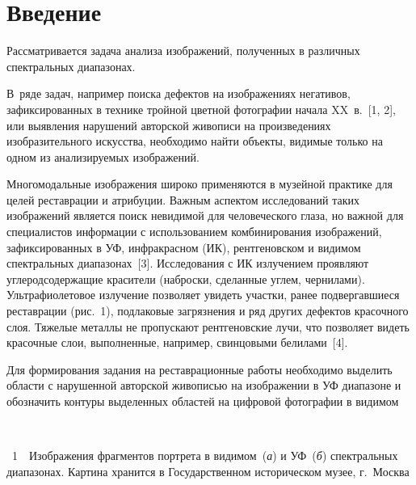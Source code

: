       \begin{multicols}{2}
      
            \label{st\stat}

\section{Введение}

  Рассматривается задача анализа изображений, полученных в различных спектральных 
диапазонах. 

В~ряде задач, например поиска дефектов на изображениях негативов, 
зафиксированных в технике тройной цветной фотографии начала XX~в.~[1, 2], или 
выявления нарушений авторской живописи на произведениях изобразительного искусства, 
необходимо найти объекты, видимые только на одном из анализируемых изображений. 

Многомодальные изображения широко применяются в музейной практике для целей 
реставрации и атрибуции. Важным аспектом исследований таких изображений является 
поиск невидимой для человеческого глаза, но важной для специалистов информации с 
использованием комбинирования изображений, зафиксированных в УФ, 
инфракрасном (ИК), рентгеновском и видимом спектральных диапазонах~[3]. Исследования с 
ИК излучением проявляют углеродсодержащие красители (наброски, сделанные 
углем, чернилами). Ультрафиолетовое излучение позволяет увидеть участки, ранее 
подвергавшиеся реставрации (рис.~1), подлаковые загрязнения и ряд других дефектов 
красочного слоя. Тяжелые металлы не пропускают рентгеновские лучи, что позволяет видеть 
красочные слои, выполненные, например, свинцовыми белилами~[4]. 

Для формирования 
задания на реставрационные работы необходимо выделить области с нарушенной авторской 
живописью на изображении в УФ диапазоне и обозначить контуры 
выделенных областей на цифровой фотографии в видимом\linebreak\vspace*{-12pt}
\begin{center} %
\vspace*{2pt}
\mbox{%
  \epsfxsize=78.626mm
}
\end{center}
\vspace*{2pt}
{{\figurename~1}\ \ \small{Изображения фрагментов портрета в видимом~(\textit{а}) и УФ~(\textit{б}) спектральных 
диапазонах. Картина хранится в Государственном историческом музее, г.~Москва}}
\vspace*{9pt}


\end{multicols}
